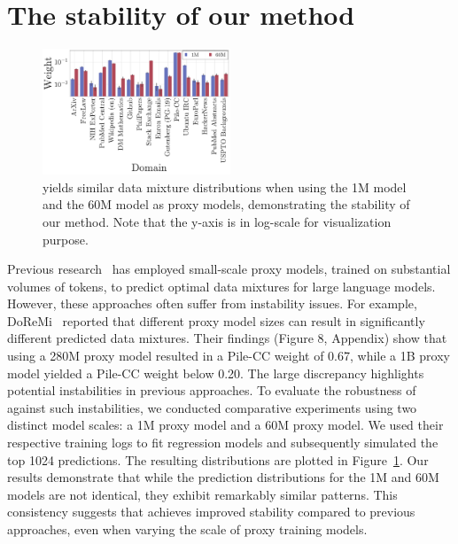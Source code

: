 \section{The stability of our method}\label{appendix:stability}

\begin{figure}[tb]
    \centering
    \includegraphics[width=0.5\textwidth]{figures/1M_vs_60M.pdf}
    \caption{\ourmethod yields similar data mixture distributions when using the 1M model and the 60M model as proxy models, demonstrating the stability of our method. Note that the y-axis is in log-scale for visualization purpose.}
    \label{fig:robustness_ours}
\end{figure}

Previous research~\citep{xie2023doremi,fan2023doge,albalak2023efficient} has employed small-scale proxy models, trained on substantial volumes of tokens, to predict optimal data mixtures for large language models.
However, these approaches often suffer from instability issues.
For example, DoReMi~\citep{xie2023doremi} reported that different proxy model sizes can result in significantly different predicted data mixtures.
Their findings (Figure 8, Appendix) show that using a 280M proxy model resulted in a Pile-CC weight of 0.67, while a 1B proxy model yielded a Pile-CC weight below 0.20.
The large discrepancy highlights potential instabilities in previous approaches.
To evaluate the robustness of \ourmethod against such instabilities, we conducted comparative experiments using two distinct model scales: a 1M proxy model and a 60M proxy model. We used their respective training logs to fit regression models and subsequently simulated the top 1024 predictions. The resulting distributions are plotted in Figure~\ref{fig:robustness_ours}.
Our results demonstrate that while the prediction distributions for the 1M and 60M models are not identical, they exhibit remarkably similar patterns. This consistency suggests that \ourmethod achieves improved stability compared to previous approaches, even when varying the scale of proxy training models.


